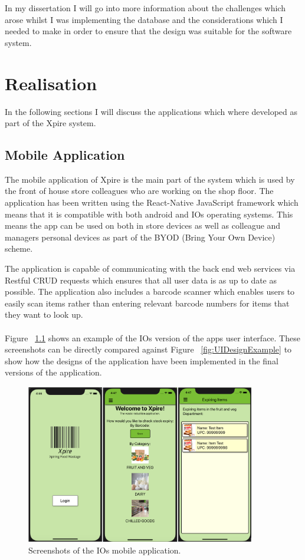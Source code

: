 \documentclass[a4paper,11pt]{report}
\begin{document}
In my dissertation I will go into more information about the challenges which arose whilst I was implementing the database  and the considerations
which I needed to make in order to ensure that the design was suitable for the software system.


\chapter{Realisation}
In the following sections I will discuss the applications which where developed as part of the Xpire system.

\section{Mobile Application}
The mobile application of Xpire is the main part of the system which is used by the front of house store colleagues who are working on the shop floor.
The application has been written using the React-Native JavaScript framework which means that it is compatible with both android and IOs operating systems.
This means the app can be used on both in store devices as well as colleague and managers personal devices as part of the BYOD (Bring Your Own Device) scheme. 

The application is capable of communicating with the back end web services via Restful CRUD requests which ensures that all user data is as up to date as possible.
The application also includes a barcode scanner which enables users to easily scan items rather than entering relevant barcode numbers for items that they want to look up. 
\\
\\
Figure ~\ref{fig:IOSScreenshots} shows an example of the IOs version of the apps user interface. These screenshots can be directly compared against Figure ~\ref{fig:UIDesignExample}
 to show how the designs of the application have been implemented in the final versions of the application.

\begin{figure}[H]
    \centering
    \includegraphics[width=10cm]{./assets/images/appUI.png}
    \caption{Screenshots of the IOs mobile application.}
    \label{fig:IOSScreenshots}
\end{figure}
\end{document}
